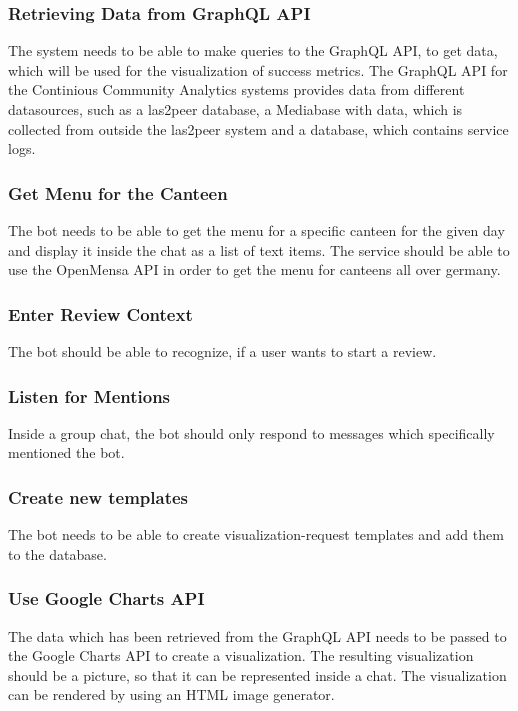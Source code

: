 \subsubsection{Retrieving Data from GraphQL API}
The system needs to be able to make queries to the GraphQL API, to get data, which will be used for the visualization of success metrics. The GraphQL API  for the Continious Community Analytics systems provides data from different datasources, such as a las2peer database, a Mediabase with data, which is collected from outside the las2peer system and a database, which contains service logs.

\subsubsection{Get Menu for the Canteen} The bot needs to be able to get the menu for a specific canteen for the given day and display it inside the chat as a list of text items. The service should be able to use the OpenMensa API \footnotemark in order to get the menu for canteens all over germany.


\subsubsection{Enter Review Context} The bot should be able to recognize, if a user wants to start a review.

\subsubsection{Listen for Mentions} Inside a group chat, the bot should only respond to messages which specifically mentioned the bot.

\subsubsection{Create new templates} The bot needs to be able to create visualization-request templates and add them to the database.

\subsubsection{Use Google Charts API} The data which has been retrieved from the GraphQL API needs to be passed to the Google Charts API to create a visualization. The resulting visualization should be a picture, so that it can be represented inside a chat. The visualization can be rendered by using an HTML image generator.

